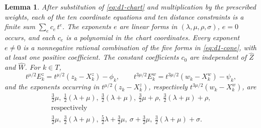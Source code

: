 \documentclass[Threeside,11pt]{article}
\newtheorem{lemma}[theorem]{Lemma}
\theoremstyle{definition}
\theoremstyle{remark}
\numberwithin{equation}{section}
\theoremstyle{remark}
\begin{document}
{\begin{lemma}\label{lem:d1-chart}
After substitution of \eqref{eq:d1-chart} and multiplication by the prescribed weights,
each of the ten coordinate equations and ten distance constraints is a finite sum $\sum_ec_e\,t^e$.
The exponents $e$ are linear forms in $(\lambda,\mu,\rho,\sigma)$, $e=0$ occurs, and each
$c_e$ is a polynomial in the chart coordinates.  Every exponent $e\ne0$ is a nonnegative
rational combination of the five forms in \eqref{eq:d1-cone}, with at least one positive
coefficient.  The constant coefficients $c_0$ are independent of $\hat Z$ and $\hat W$.
For $k\in T$,
\[
  t^{\mu/2}E^z_k=t^{\mu/2}(z_k-X^z_k)-\phi_k,\qquad
  t^{3\mu/2}E^w_k=t^{3\mu/2}(w_k-X^w_k)-\psi_k,
\]
and the exponents occurring in $t^{\mu/2}(z_k-X^z_k)$, respectively $t^{3\mu/2}(w_k-X^w_k)$, are
\[
\begin{gathered}
  \tfrac32\mu,\ \tfrac12(\lambda+\mu),\ \tfrac32(\lambda+\mu),\ \tfrac32\mu+\rho,\
  \tfrac32(\lambda+\mu)+\rho,\\
  \text{respectively}\\
  \tfrac32\mu,\ \tfrac32(\lambda+\mu),\ \tfrac52\lambda+\tfrac32\mu,\ \sigma+\tfrac32\mu,\
  \tfrac32(\lambda+\mu)+\sigma .
\end{gathered}
\]
\end{lemma}}
\end{document}
